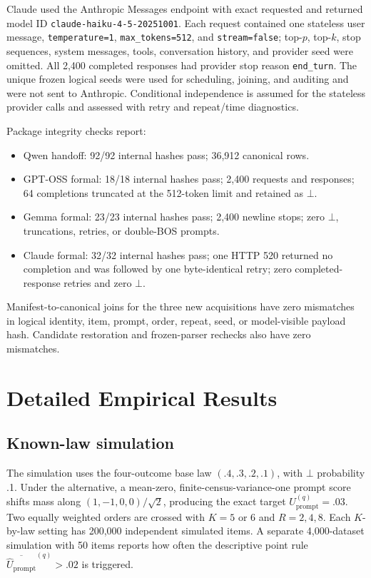 \documentclass[letterpaper]{article}
\newcommand{\1}{\mathbf 1}
\newcommand{\Up}{U_{\mathrm{prompt}}}
\begin{document}


Claude used the Anthropic Messages endpoint with exact requested and returned
model ID \texttt{claude-haiku-4-5-20251001}. Each request contained one
stateless user message, \texttt{temperature=1},
\texttt{max\_tokens=512}, and \texttt{stream=false}; top-$p$, top-$k$, stop
sequences, system messages, tools, conversation history, and provider seed
were omitted. All 2,400 completed responses had provider stop reason
\texttt{end\_turn}. The unique frozen logical seeds were used for scheduling,
joining, and auditing and were not sent to Anthropic. Conditional independence
is assumed for the stateless provider calls and assessed with retry and
repeat/time diagnostics.

Package integrity checks report:
\begin{itemize}
    \item Qwen handoff: 92/92 internal hashes pass; 36,912 canonical rows.
    \item GPT-OSS formal: 18/18 internal hashes pass; 2,400 requests and
    responses; 64 completions truncated at the 512-token limit and retained as
    $\bot$.
    \item Gemma formal: 23/23 internal hashes pass; 2,400 newline stops; zero
    $\bot$, truncations, retries, or double-BOS prompts.
    \item Claude formal: 32/32 internal hashes pass; one HTTP 520 returned no
    completion and was followed by one byte-identical retry; zero
    completed-response retries and zero $\bot$.
\end{itemize}
Manifest-to-canonical joins for the three new acquisitions have zero
mismatches in logical identity, item, prompt, order, repeat, seed, or
model-visible payload hash. Candidate restoration and frozen-parser rechecks
also have zero mismatches.

\section{Detailed Empirical Results}

\subsection{Known-law simulation}




The simulation uses the four-outcome base law $(.4,.3,.2,.1)$, with $\bot$
probability .1. Under the alternative, a mean-zero, finite-census-variance-one
prompt score shifts mass along $(1,-1,0,0)/\sqrt2$, producing the exact target
$\Up^{(q)}=.03$. Two equally weighted orders are crossed with $K=5$ or 6 and
$R=2,4,8$. Each $K$-by-law setting has 200,000 independent simulated items.
A separate 4,000-dataset simulation with 50 items reports how often the
descriptive point rule $\overline{\widehat\Up}^{(q)}>.02$ is triggered.
\end{document}
